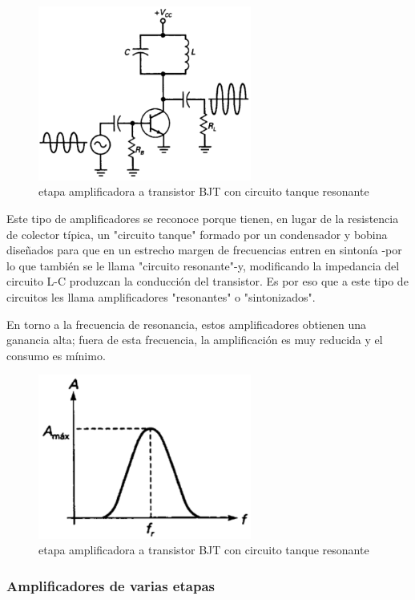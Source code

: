 \begin{figure}[H]
    \centering
    \includegraphics[width=7cm]{Imagenes/amplificador resonante01.png}
    \caption{etapa amplificadora a transistor BJT con circuito tanque resonante }
    \label{fig:clase_c}
\end{figure}

Este tipo de amplificadores se reconoce porque tienen, en lugar de la resistencia de colector típica, un "circuito tanque" formado por un condensador y bobina diseñados para que en un estrecho margen de frecuencias entren en sintonía -por lo que también se le llama "circuito resonante"-y, modificando la impedancia del circuito L-C produzcan la conducción del transistor. Es por eso que a este tipo de circuitos les llama amplificadores "resonantes" o "sintonizados".

En torno a la frecuencia de resonancia, estos amplificadores obtienen una ganancia alta; fuera de esta frecuencia, la amplificación es muy reducida y el consumo es mínimo.


\begin{figure}[H]
    \centering
    \includegraphics[width=7cm]{Imagenes/amplificador resonante02.png}
    \caption{etapa amplificadora a transistor BJT con circuito tanque resonante }
    \label{fig:campana de gauss}
\end{figure}

\subsubsection{Amplificadores de varias etapas}

